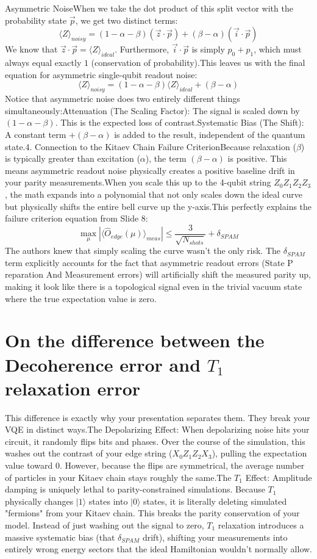 \documentclass[11pt]{article}
\begin{document}
Asymmetric NoiseWhen we take the dot product of this split vector with the probability state $\vec{p}$, we get two distinct terms:$$\langle Z \rangle_{noisy} = (1 - \alpha - \beta)(\vec{z} \cdot \vec{p}) + (\beta - \alpha)(\vec{i} \cdot \vec{p})$$We know that $\vec{z} \cdot \vec{p} = \langle Z \rangle_{ideal}$. Furthermore, $\vec{i} \cdot \vec{p}$ is simply $p_0 + p_1$, which must always equal exactly $1$ (conservation of probability).This leaves us with the final equation for asymmetric single-qubit readout noise:$$\langle Z \rangle_{noisy} = (1 - \alpha - \beta)\langle Z \rangle_{ideal} + (\beta - \alpha)$$Notice that asymmetric noise does two entirely different things simultaneously:Attenuation (The Scaling Factor): The signal is scaled down by $(1 - \alpha - \beta)$. This is the expected loss of contrast.Systematic Bias (The Shift): A constant term $+(\beta - \alpha)$ is added to the result, independent of the quantum state.4. Connection to the Kitaev Chain Failure CriterionBecause relaxation ($\beta$) is typically greater than excitation ($\alpha$), the term $(\beta - \alpha)$ is positive. This means asymmetric readout noise physically creates a positive baseline drift in your parity measurements.When you scale this up to the 4-qubit string $Z_0 Z_1 Z_2 Z_3$, the math expands into a polynomial that not only scales down the ideal curve but physically shifts the entire bell curve up the y-axis.This perfectly explains the failure criterion equation from Slide 8:
  $$\max_{\mu} |\langle \hat{O}_{edge}(\mu) \rangle_{meas}| \le \frac{3}{\sqrt{N_{shots}}} + \delta_{SPAM}$$The authors knew that simply scaling the curve wasn't the only risk. The $\delta_{SPAM}$ term explicitly accounts for the fact that asymmetric readout errors ($\text{S}$tate $\text{P}$reparation $\text{A}$nd $\text{M}$easurement errors) will artificially shift the measured parity up, making it look like there is a topological signal even in the trivial vacuum state where the true expectation value is zero.

\section{On the difference between the Decoherence error and $T_1$ relaxation error}

This difference is exactly why your presentation separates them. They break your VQE in distinct ways.The Depolarizing Effect: When depolarizing noise hits your circuit, it randomly flips bits and phases. Over the course of the simulation, this washes out the contrast of your edge string ($X_0 Z_1 Z_2 X_3$), pulling the expectation value toward $0$. However, because the flips are symmetrical, the average number of particles in your Kitaev chain stays roughly the same.The $T_1$ Effect: Amplitude damping is uniquely lethal to parity-constrained simulations. Because $T_1$ physically changes $|1\rangle$ states into $|0\rangle$ states, it is literally deleting simulated "fermions" from your Kitaev chain. This breaks the parity conservation of your model. Instead of just washing out the signal to zero, $T_1$ relaxation introduces a massive systematic bias (that $\delta_{SPAM}$ drift), shifting your measurements into entirely wrong energy sectors that the ideal Hamiltonian wouldn't normally allow.
\end{document}
